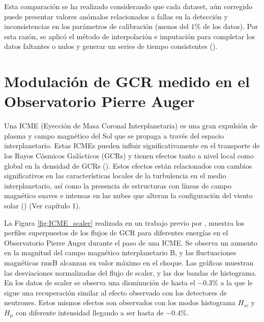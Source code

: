 Esta comparación se ha realizado considerando que cada dataset, aún corregido puede presentar valores anómalos relacionados a fallas en la detección y inconsistencias en los parámetros de calibración (menos del $1\%$ de los datos). Por esta razón, se aplicó el método de interpolación e imputación para completar los datos faltantes o nulos y generar un series de tiempo consistentes (\cite{wang_2019}).
%


\section{Modulación de GCR medido en el Observatorio Pierre Auger}
Una ICME (Eyección de Masa Coronal Interplanetaria) es una gran expulsión de plasma y campo magnético del Sol que se propaga a través del espacio interplanetario. Estas ICMEs pueden influir significativamente en el transporte de los Rayos Cósmicos Galácticos (GCRs) y tienen efectos tanto a nivel local como global en la densidad de GCRs (\cite{Davies_2023}). Estos efectos están relacionados con cambios significativos en las características locales de la turbulencia en el medio interplanetario, así como la presencia de estructuras con líneas de campo magnético suaves e intensas en las nubes que alteran la configuración del viento solar (\cite{Krittinatham_2009}) (Ver capítulo 1).

La Figura \ref{fig:ICME_scaler} realizada en un trabajo previo por \cite{masias_2017}, muestra los perfiles superpuestos de los flujos de GCR para diferentes energías en el Observatorio Pierre Auger durante el paso de una ICME. Se observa un aumento en la magnitud del campo magnético interplanetario B, y las fluctuaciones magnéticas rmsB alcanzan su valor máximo en el choque. Las gráficas muestran las desviaciones normalizadas del flujo de scaler, y las dos bandas de histograma. En los datos de scaler se observa una disminución de hasta el −0.3\% a la que le sigue una recuperación similar al efecto observado con los detectores de neutrones. Estos mismos efectos son observados con los modos histograma $H_{sc}$ y $H_{\mu}$ con diferente intensidad llegando a ser hasta de −0.4\%.

